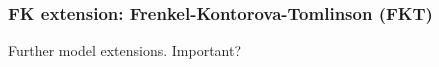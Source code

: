 










\subsubsection{FK extension: Frenkel-Kontorova-Tomlinson (FKT)}

Further model extensions. Important? 






